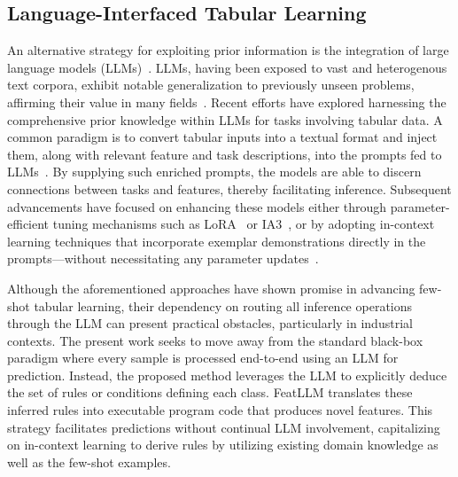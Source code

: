 \subsection{Language-Interfaced Tabular Learning} An alternative strategy for exploiting prior information is the integration of large language models (LLMs)~\cite{anil2023palm,openai2023gpt4}. LLMs, having been exposed to vast and heterogenous text corpora, exhibit notable generalization to previously unseen problems, affirming their value in many fields~\cite{brown2020language}. Recent efforts have explored harnessing the comprehensive prior knowledge within LLMs for tasks involving tabular data. A common paradigm is to convert tabular inputs into a textual format and inject them, along with relevant feature and task descriptions, into the prompts fed to LLMs~\cite{dinh2022lift,hegselmann2023tabllm,wang2023anypredict}. By supplying such enriched prompts, the models are able to discern connections between tasks and features, thereby facilitating inference. Subsequent advancements have focused on enhancing these models either through parameter-efficient tuning mechanisms such as LoRA~\cite{hu2021lora} or IA3~\cite{liu2022few}, or by adopting in-context learning techniques that incorporate exemplar demonstrations directly in the prompts—without necessitating any parameter updates~\cite{dinh2022lift,hegselmann2023tabllm,nam2023semi,slack2023tablet}.

Although the aforementioned approaches have shown promise in advancing few-shot tabular learning, their dependency on routing all inference operations through the LLM can present practical obstacles, particularly in industrial contexts. The present work seeks to move away from the standard black-box paradigm where every sample is processed end-to-end using an LLM for prediction. Instead, the proposed method leverages the LLM to explicitly deduce the set of rules or conditions defining each class. \textsf{FeatLLM} translates these inferred rules into executable program code that produces novel features. This strategy facilitates predictions without continual LLM involvement, capitalizing on in-context learning to derive rules by utilizing existing domain knowledge as well as the few-shot examples.


